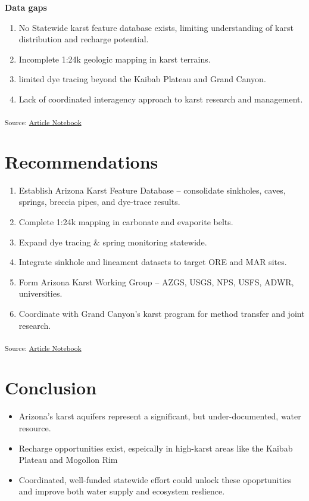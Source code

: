 \documentclass[
]{agujournal2019}
\providecommand{\tightlist}{%
  \setlength{\itemsep}{0pt}\setlength{\parskip}{0pt}}\usepackage{longtable,booktabs,array}
\begin{document}
\textbf{Data gaps}

\begin{enumerate}
\def\labelenumi{\arabic{enumi}.}
\item
  No Statewide karst feature database exists, limiting understanding of
  karst distribution and recharge potential.
\item
  Incomplete 1:24k geologic mapping in karst terrains.
\item
  limited dye tracing beyond the Kaibab Plateau and Grand Canyon.
\item
  Lack of coordinated interagency approach to karst research and
  management.
\end{enumerate}

\textsubscript{Source:
\href{https://Ryan3Lima.github.io/ATUR-KARST/index.ipynb.html}{Article
Notebook}}

\section{Recommendations}\label{recommendations}

\begin{enumerate}
\def\labelenumi{\arabic{enumi}.}
\item
  Establish Arizona Karst Feature Database -- consolidate sinkholes,
  caves, springs, breccia pipes, and dye-trace results.
\item
  Complete 1:24k mapping in carbonate and evaporite belts.
\item
  Expand dye tracing \& spring monitoring statewide.
\item
  Integrate sinkhole and lineament datasets to target ORE and MAR sites.
\item
  Form Arizona Karst Working Group -- AZGS, USGS, NPS, USFS, ADWR,
  universities.
\item
  Coordinate with Grand Canyon's karst program for method transfer and
  joint research.
\end{enumerate}

\textsubscript{Source:
\href{https://Ryan3Lima.github.io/ATUR-KARST/index.ipynb.html}{Article
Notebook}}

\section{Conclusion}\label{conclusion}

\begin{itemize}
\tightlist
\item
  Arizona's karst aquifers represent a significant, but
  under-documented, water resource.
\item
  Recharge opportunities exist, espeically in high-karst areas like the
  Kaibab Plateau and Mogollon Rim
\item
  Coordinated, well-funded statewide effort could unlock these
  opoprtunities and improve both water supply and ecosystem reslience.
\end{itemize}
\end{document}
